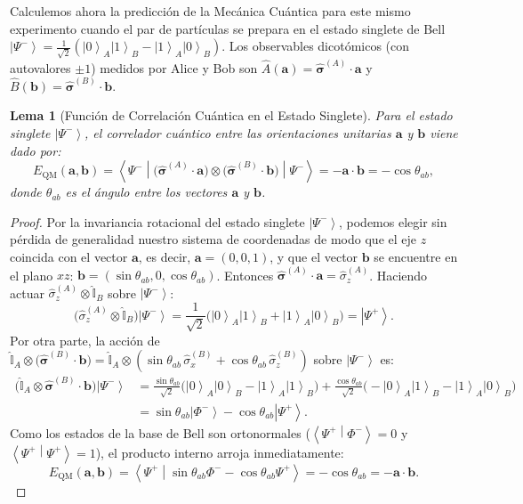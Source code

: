 \documentclass[11pt,a4paper,twoside]{report}
\theoremstyle{definition}
\theoremstyle{plain}
\newtheorem{lema}{Lema}[chapter]
\theoremstyle{remark}
\newcommand{\ket}[1]{\left| #1 \right\rangle}
\newcommand{\braket}[2]{\left\langle #1 \middle| #2 \right\rangle}
\newcommand{\mel}[3]{\left\langle #1 \middle| #2 \middle| #3 \right\rangle}
\newcommand{\op}[1]{\hat{#1}}
\newcommand{\ident}{\hat{\mathbb{I}}}
\begin{document}
Calculemos ahora la predicción de la Mecánica Cuántica para este mismo experimento cuando el par de partículas se prepara en el estado singlete de Bell $\ket{\Psi^-} = \frac{1}{\sqrt{2}}(\ket{0}_A\ket{1}_B - \ket{1}_A\ket{0}_B)$. Los observables dicotómicos (con autovalores $\pm 1$) medidos por Alice y Bob son $\op{A}(\bm{a}) = \bm{\op{\sigma}}^{(A)}\cdot \bm{a}$ y $\op{B}(\bm{b}) = \bm{\op{\sigma}}^{(B)}\cdot \bm{b}$.

\begin{lema}[Función de Correlación Cuántica en el Estado Singlete]
Para el estado singlete $\ket{\Psi^-}$, el correlador cuántico entre las orientaciones unitarias $\bm{a}$ y $\bm{b}$ viene dado por:
\begin{equation}
    E_{\text{QM}}(\bm{a}, \bm{b}) = \mel{\Psi^-}{\big(\bm{\op{\sigma}}^{(A)}\cdot \bm{a}\big) \otimes \big(\bm{\op{\sigma}}^{(B)}\cdot \bm{b}\big)}{\Psi^-} = -\bm{a}\cdot \bm{b} = -\cos\theta_{ab},
\end{equation}
donde $\theta_{ab}$ es el ángulo entre los vectores $\bm{a}$ y $\bm{b}$.
\end{lema}

\begin{proof}
Por la invariancia rotacional del estado singlete $\ket{\Psi^-}$, podemos elegir sin pérdida de generalidad nuestro sistema de coordenadas de modo que el eje $z$ coincida con el vector $\bm{a}$, es decir, $\bm{a} = (0,0,1)$, y que el vector $\bm{b}$ se encuentre en el plano $xz$: $\bm{b} = (\sin\theta_{ab}, 0, \cos\theta_{ab})$. Entonces $\bm{\op{\sigma}}^{(A)}\cdot \bm{a} = \op{\sigma}_z^{(A)}$. Haciendo actuar $\op{\sigma}_z^{(A)} \otimes \ident_B$ sobre $\ket{\Psi^-}$:
\begin{equation}
    \big(\op{\sigma}_z^{(A)} \otimes \ident_B\big)\ket{\Psi^-} = \frac{1}{\sqrt{2}}\big(\ket{0}_A\ket{1}_B + \ket{1}_A\ket{0}_B\big) = \ket{\Psi^+}.
\end{equation}
Por otra parte, la acción de $\ident_A \otimes \big(\bm{\op{\sigma}}^{(B)}\cdot \bm{b}\big) = \ident_A \otimes (\sin\theta_{ab}\,\op{\sigma}_x^{(B)} + \cos\theta_{ab}\,\op{\sigma}_z^{(B)})$ sobre $\ket{\Psi^-}$ es:
\begin{align}
    \big(\ident_A \otimes \bm{\op{\sigma}}^{(B)}\cdot \bm{b}\big)\ket{\Psi^-} &= \frac{\sin\theta_{ab}}{\sqrt{2}}\big(\ket{0}_A\ket{0}_B - \ket{1}_A\ket{1}_B\big) + \frac{\cos\theta_{ab}}{\sqrt{2}}\big(-\ket{0}_A\ket{1}_B - \ket{1}_A\ket{0}_B\big) \nonumber \\
    &= \sin\theta_{ab}\ket{\Phi^-} - \cos\theta_{ab}\ket{\Psi^+}.
\end{align}
Como los estados de la base de Bell son ortonormales ($\braket{\Psi^+}{\Phi^-} = 0$ y $\braket{\Psi^+}{\Psi^+} = 1$), el producto interno arroja inmediatamente:
\begin{equation}
    E_{\text{QM}}(\bm{a}, \bm{b}) = \braket{\Psi^+}{\sin\theta_{ab}\Phi^- - \cos\theta_{ab}\Psi^+} = -\cos\theta_{ab} = -\bm{a}\cdot \bm{b}.
\end{equation}
\end{proof}
\end{document}
